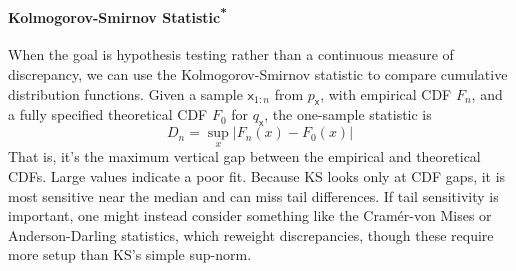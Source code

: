 \paragraph*{\texorpdfstring{Kolmogorov-Smirnov Statistic\textsuperscript{*}}{Kolmogorov-Smirnov Statistic}} When the goal is hypothesis testing rather than a continuous measure of discrepancy, we can use the Kolmogorov-Smirnov statistic to compare cumulative distribution functions. Given a sample $\mathsf{x}_{1:n}$ from $p_{\mathsf{x}}$, with empirical CDF $F_n$, and a fully specified theoretical CDF $F_0$ for $q_{\mathsf{x}}$, the one-sample statistic is 
\begin{equation}
    D_n=\sup_x |F_n(x)-F_0(x)|
\end{equation}
That is, it's the maximum vertical gap between the empirical and theoretical CDFs. Large values indicate a poor fit. Because KS looks only at CDF gaps, it is most sensitive near the median and can miss tail differences. If tail sensitivity is important, one might instead consider something like the Cram\'er-von Mises or Anderson-Darling statistics, which reweight discrepancies, though these require more setup than KS's simple sup-norm.


